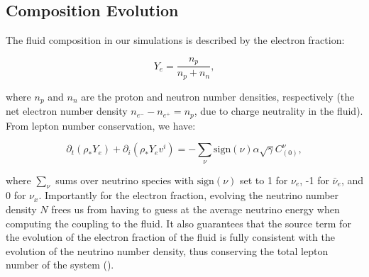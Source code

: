 \subsection{Composition Evolution}

The fluid composition in our simulations is described by the electron fraction:

\begin{equation}
  Y_e = \frac{n_p}{n_p + n_n},
\end{equation}

where $n_p$ and $n_n$ are the proton and neutron number densities, respectively (the net electron number density $n_{e^{-}} - n_{e^{+}} = n_p$, due to charge neutrality in the fluid). From lepton number conservation, we have:

\begin{equation}
  \partial_t \left(\rho_* Y_e \right) + \partial_i\left(\rho_*Y_e v^i\right)= -\sum_{\nu}\textrm{sign}(\nu)\alpha \sqrt{\gamma} C^{\nu}_{(0)},
\end{equation}

where $\sum_{\nu}$ sums over neutrino species with $\textrm{sign}(\nu)$ set to 1 for $\nu_e$, -1 for $\bar \nu_e$, and 0 for $\nu_x$. Importantly for the electron fraction, evolving the neutrino number density $N$ frees us from having to guess at the average neutrino energy when computing the coupling to the fluid. It also guarantees that the source term for the evolution of the electron fraction of the fluid is fully consistent with the evolution of the neutrino number density, thus conserving the total lepton number of the system (\cite{foucart2016impact}). 

